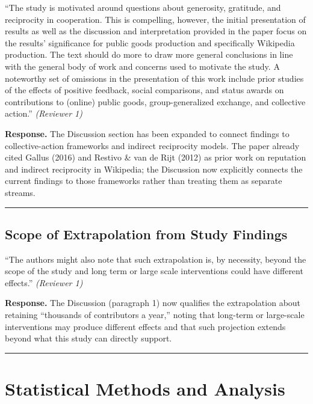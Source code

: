 \documentclass[12pt]{article}
\newenvironment{reviewquote}{%
  \def\FrameCommand{{\color{quotebarcolor}\vrule width 2pt}\colorbox{quotebg}}%
  \MakeFramed{\advance\hsize-\width \FrameRestore}%
  \small
}{%
  \endMakeFramed
}
\begin{document}
\begin{reviewquote}
``The study is motivated around questions about generosity, gratitude, and reciprocity in cooperation. This is compelling, however, the initial presentation of results as well as the discussion and interpretation provided in the paper focus on the results' significance for public goods production and specifically Wikipedia production. The text should do more to draw more general conclusions in line with the general body of work and concerns used to motivate the study. A noteworthy set of omissions in the presentation of this work include prior studies of the effects of positive feedback, social comparisons, and status awards on contributions to (online) public goods, group-generalized exchange, and collective action.'' \textit{(Reviewer 1)}
\end{reviewquote}

\textbf{Response.} The Discussion section has been expanded to connect findings to collective-action frameworks and indirect reciprocity models. The paper already cited Gallus (2016) and Restivo \& van de Rijt (2012) as prior work on reputation and indirect reciprocity in Wikipedia; the Discussion now explicitly connects the current findings to those frameworks rather than treating them as separate streams.

\bigskip\hrule\bigskip

\subsection{Scope of Extrapolation from Study Findings}

\begin{reviewquote}
``The authors might also note that such extrapolation is, by necessity, beyond the scope of the study and long term or large scale interventions could have different effects.'' \textit{(Reviewer 1)}
\end{reviewquote}

\textbf{Response.} The Discussion (paragraph 1) now qualifies the extrapolation about retaining ``thousands of contributors a year,'' noting that long-term or large-scale interventions may produce different effects and that such projection extends beyond what this study can directly support.

\bigskip\hrule\bigskip

\section{Statistical Methods and Analysis}
\end{document}
